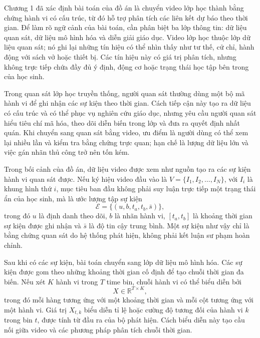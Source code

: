 Chương 1 đã xác định bài toán của đồ án là chuyển video lớp học thành bằng chứng hành vi có cấu trúc, từ đó hỗ trợ phân tích các liên kết dự báo theo thời gian. Để làm rõ ngữ cảnh của bài toán, cần phân biệt ba lớp thông tin: dữ liệu quan sát, dữ liệu mô hình hóa và diễn giải giáo dục. Video lớp học thuộc lớp dữ liệu quan sát; nó ghi lại những tín hiệu có thể nhìn thấy như tư thế, cử chỉ, hành động với sách vở hoặc thiết bị. Các tín hiệu này có giá trị phân tích, nhưng không trực tiếp chứa đầy đủ ý định, động cơ hoặc trạng thái học tập bên trong của học sinh.

Trong quan sát lớp học truyền thống, người quan sát thường dùng một bộ mã hành vi để ghi nhận các sự kiện theo thời gian. Cách tiếp cận này tạo ra dữ liệu có cấu trúc và có thể phục vụ nghiên cứu giáo dục, nhưng yêu cầu người quan sát hiểu tiêu chí mã hóa, theo dõi diễn biến trong lớp và đưa ra quyết định nhất quán. Khi chuyển sang quan sát bằng video, ưu điểm là người dùng có thể xem lại nhiều lần và kiểm tra bằng chứng trực quan; hạn chế là lượng dữ liệu lớn và việc gán nhãn thủ công trở nên tốn kém.

Trong bối cảnh của đồ án, dữ liệu video được xem như nguồn tạo ra các sự kiện hành vi quan sát được. Nếu ký hiệu video đầu vào là \(V = \{I_1, I_2, \ldots, I_N\}\), với \(I_i\) là khung hình thứ \(i\), mục tiêu ban đầu không phải suy luận trực tiếp một trạng thái ẩn của học sinh, mà là ước lượng tập sự kiện
\begin{equation}
\label{eq:observed-event-set}
    \mathcal{E} = \{(u,b,t_a,t_b,\bar{s})\},
\end{equation}
trong đó \(u\) là định danh theo dõi, \(b\) là nhãn hành vi, \([t_a,t_b]\) là khoảng thời gian sự kiện được ghi nhận và \(\bar{s}\) là độ tin cậy trung bình. Một sự kiện như vậy chỉ là bằng chứng quan sát do hệ thống phát hiện, không phải kết luận sư phạm hoàn chỉnh.

Sau khi có các sự kiện, bài toán chuyển sang lớp dữ liệu mô hình hóa. Các sự kiện được gom theo những khoảng thời gian cố định để tạo chuỗi thời gian đa biến. Nếu xét \(K\) hành vi trong \(T\) time bin, chuỗi hành vi có thể biểu diễn bởi
\begin{equation}
\label{eq:behavior-time-series}
    X \in \mathbb{R}^{T \times K},
\end{equation}
trong đó mỗi hàng tương ứng với một khoảng thời gian và mỗi cột tương ứng với một hành vi. Giá trị \(X_{t,k}\) biểu diễn tỉ lệ hoặc cường độ tương đối của hành vi \(k\) trong bin \(t\), được tính từ đầu ra của bộ phát hiện. Cách biểu diễn này tạo cầu nối giữa video và các phương pháp phân tích chuỗi thời gian.

